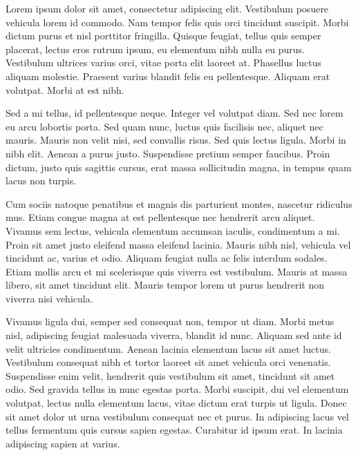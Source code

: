 Lorem ipsum dolor sit amet, consectetur adipiscing elit. Vestibulum posuere vehicula lorem id commodo. Nam tempor felis quis orci tincidunt suscipit. Morbi dictum purus et nisl porttitor fringilla. Quisque feugiat, tellus quis semper placerat, lectus eros rutrum ipsum, eu elementum nibh nulla eu purus. Vestibulum ultrices varius orci, vitae porta elit laoreet at. Phasellus luctus aliquam molestie. Praesent varius blandit felis eu pellentesque. Aliquam erat volutpat. Morbi at est nibh.

Sed a mi tellus, id pellentesque neque. Integer vel volutpat diam. Sed nec lorem eu arcu lobortis porta. Sed quam nunc, luctus quis facilisis nec, aliquet nec mauris. Mauris non velit nisi, sed convallis risus. Sed quis lectus ligula. Morbi in nibh elit. Aenean a purus justo. Suspendisse pretium semper faucibus. Proin dictum, justo quis sagittis cursus, erat massa sollicitudin magna, in tempus quam lacus non turpis.

Cum sociis natoque penatibus et magnis dis parturient montes, nascetur ridiculus mus. Etiam congue magna at est pellentesque nec hendrerit arcu aliquet. Vivamus sem lectus, vehicula elementum accumsan iaculis, condimentum a mi. Proin sit amet justo eleifend massa eleifend lacinia. Mauris nibh nisl, vehicula vel tincidunt ac, varius et odio. Aliquam feugiat nulla ac felis interdum sodales. Etiam mollis arcu et mi scelerisque quis viverra est vestibulum. Mauris at massa libero, sit amet tincidunt elit. Mauris tempor lorem ut purus hendrerit non viverra nisi vehicula.

Vivamus ligula dui, semper sed consequat non, tempor ut diam. Morbi metus nisl, adipiscing feugiat malesuada viverra, blandit id nunc. Aliquam sed ante id velit ultricies condimentum. Aenean lacinia elementum lacus sit amet luctus. Vestibulum consequat nibh et tortor laoreet sit amet vehicula orci venenatis. Suspendisse enim velit, hendrerit quis vestibulum sit amet, tincidunt sit amet odio. Sed gravida tellus in nunc egestas porta. Morbi suscipit, dui vel elementum volutpat, lectus nulla elementum lacus, vitae dictum erat turpis ut ligula. Donec sit amet dolor ut urna vestibulum consequat nec et purus. In adipiscing lacus vel tellus fermentum quis cursus sapien egestas. Curabitur id ipsum erat. In lacinia adipiscing sapien at varius.

